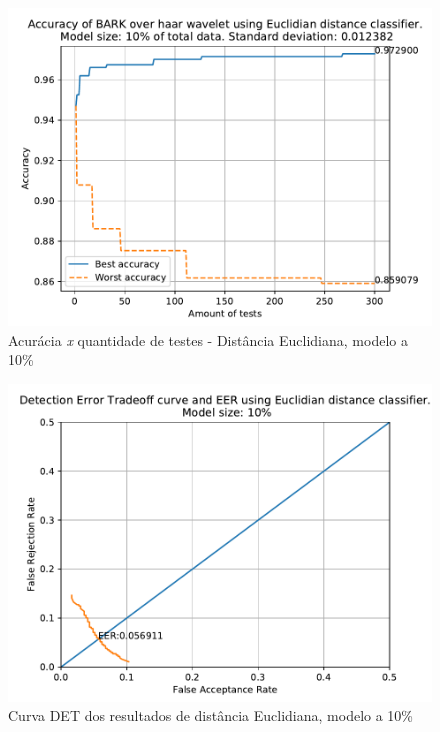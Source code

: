 			\begin{figure}[h]
				\centering
				\includegraphics[width=.9\linewidth]{images/results/confusionMatrices/classifier_Euclidian_10}
				\caption{Acurácia \textit{x} quantidade de testes - Distância Euclidiana, modelo a 10\%}
				\label{fig:classifiereuclidian10}
			\end{figure}

			\FloatBarrier

			\begin{figure}[H]
				\centering
				\includegraphics[width=.9\linewidth]{images/results/det/DET_for_classifier_Euclidian_10}
				\caption{Curva DET dos resultados de distância Euclidiana, modelo a 10\%}
				\label{fig:detforclassifiereuclidian10}
			\end{figure}
			
